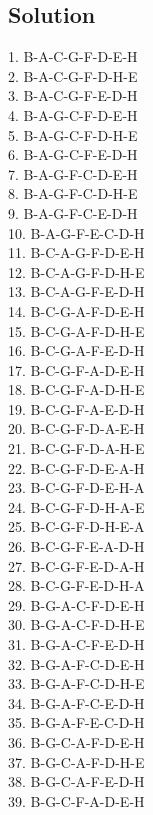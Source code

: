 \documentclass[10pt]{article}
\begin{document}
\subsection*{Solution}
1. B-A-C-G-F-D-E-H \\
2. B-A-C-G-F-D-H-E \\
3. B-A-C-G-F-E-D-H \\
4. B-A-G-C-F-D-E-H \\
5. B-A-G-C-F-D-H-E \\
6. B-A-G-C-F-E-D-H \\
7. B-A-G-F-C-D-E-H \\
8. B-A-G-F-C-D-H-E \\
9. B-A-G-F-C-E-D-H \\
10. B-A-G-F-E-C-D-H \\
11. B-C-A-G-F-D-E-H \\
12. B-C-A-G-F-D-H-E \\
13. B-C-A-G-F-E-D-H \\
14. B-C-G-A-F-D-E-H \\
15. B-C-G-A-F-D-H-E \\
16. B-C-G-A-F-E-D-H \\
17. B-C-G-F-A-D-E-H \\
18. B-C-G-F-A-D-H-E \\
19. B-C-G-F-A-E-D-H \\
20. B-C-G-F-D-A-E-H \\
21. B-C-G-F-D-A-H-E \\
22. B-C-G-F-D-E-A-H \\
23. B-C-G-F-D-E-H-A \\
24. B-C-G-F-D-H-A-E \\
25. B-C-G-F-D-H-E-A \\
26. B-C-G-F-E-A-D-H \\
27. B-C-G-F-E-D-A-H \\
28. B-C-G-F-E-D-H-A \\
29. B-G-A-C-F-D-E-H \\
30. B-G-A-C-F-D-H-E \\
31. B-G-A-C-F-E-D-H \\
32. B-G-A-F-C-D-E-H \\
33. B-G-A-F-C-D-H-E \\
34. B-G-A-F-C-E-D-H \\
35. B-G-A-F-E-C-D-H \\
36. B-G-C-A-F-D-E-H \\
37. B-G-C-A-F-D-H-E \\
38. B-G-C-A-F-E-D-H \\
39. B-G-C-F-A-D-E-H \\
\end{document}
